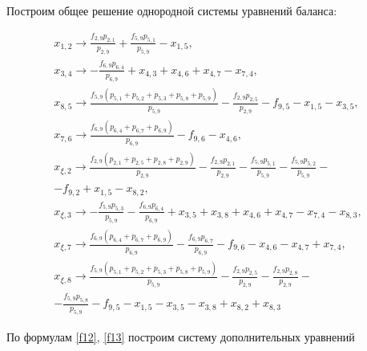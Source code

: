 \documentclass[14pt]{extarticle}%
\begin{document}
Построим общее решение однородной системы уравнений баланса:

\begin{equation}\begin{gathered}
	x_{1,2}\to \frac{f_{2,9} p_{2,1}}{p_{2,9}}+\frac{f_{5,9} p_{5,1}}{p_{5,9}}-x_{1,5},\\
	x_{3,4}\to -\frac{f_{6,9} p_{6,4}}{p_{6,9}}+x_{4,3}+x_{4,6}+x_{4,7}-x_{7,4},\\
	x_{8,5}\to \frac{f_{5,9} \left(p_{5,1}+p_{5,2}+p_{5,3}+p_{5,8}+p_{5,9}\right)}{p_{5,9}}-\frac{f_{2,9} p_{2,5}}{p_{2,9}}-f_{9,5}-x_{1,5}-x_{3,5},\\
	x_{7,6}\to \frac{f_{6,9} \left(p_{6,4}+p_{6,7}+p_{6,9}\right)}{p_{6,9}}-f_{9,6}-x_{4,6},\\
	x_{\xi,2}\to \frac{f_{2,9} \left(p_{2,1}+p_{2,5}+p_{2,8}+p_{2,9}\right)}{p_{2,9}}-\frac{f_{2,9} p_{2,1}}{p_{2,9}}-\frac{f_{5,9} p_{5,1}}{p_{5,9}}-\frac{f_{5,9} p_{5,2}}{p_{5,9}}-\\-f_{9,2}+x_{1,5}-x_{8,2},\\
	x_{\xi,3}\to -\frac{f_{5,9} p_{5,3}}{p_{5,9}}-\frac{f_{6,9} p_{6,4}}{p_{6,9}}+x_{3,5}+x_{3,8}+x_{4,6}+x_{4,7}-x_{7,4}-x_{8,3},\\
	x_{\xi,7}\to \frac{f_{6,9} \left(p_{6,4}+p_{6,7}+p_{6,9}\right)}{p_{6,9}}-\frac{f_{6,9} p_{6,7}}{p_{6,9}}-f_{9,6}-x_{4,6}-x_{4,7}+x_{7,4},\\
	x_{\xi,8}\to \frac{f_{5,9} \left(p_{5,1}+p_{5,2}+p_{5,3}+p_{5,8}+p_{5,9}\right)}{p_{5,9}}-\frac{f_{2,9} p_{2,5}}{p_{2,9}}-\frac{f_{2,9} p_{2,8}}{p_{2,9}}-\\-\frac{f_{5,9} p_{5,8}}{p_{5,9}}-f_{9,5}-x_{1,5}-x_{3,5}-x_{3,8}+x_{8,2}+x_{8,3}
	\end{gathered}
\end{equation}

По формулам \eqref{f12}, \eqref{f13} построим систему дополнительных уравнений
\end{document}

